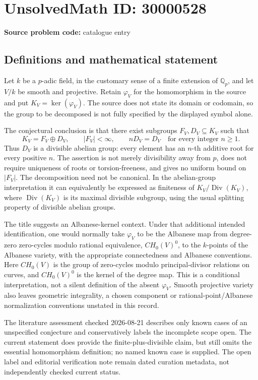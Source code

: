 \documentclass[11pt]{article}
\newcommand{\Q}{\mathbb{Q}}
\begin{document}
\section*{UnsolvedMath ID: 30000528}
\textbf{Source problem code:} catalogue entry
\subsection{Definitions and mathematical statement}
Let \(k\) be a \(p\)-adic field, in the customary sense of a finite extension of \(\Q_p\), and let \(V/k\) be smooth and projective. Retain \(\varphi_V\) for the homomorphism in the source and put \(K_V=\ker(\varphi_V)\). The source does not state its domain or codomain, so the group to be decomposed is not fully specified by the displayed symbol alone.

The conjectural conclusion is that there exist subgroups \(F_V,D_V\subseteq K_V\) such that
\[
 K_V=F_V\oplus D_V,\qquad |F_V|<\infty,\qquad
 nD_V=D_V\quad\text{for every integer }n\geq1.
\]
Thus \(D_V\) is a divisible abelian group: every element has an \(n\)-th additive root for every positive \(n\). The assertion is not merely divisibility away from \(p\), does not require uniqueness of roots or torsion-freeness, and gives no uniform bound on \(|F_V|\). The decomposition need not be canonical. In the abelian-group interpretation it can equivalently be expressed as finiteness of \(K_V/\operatorname{Div}(K_V)\), where \(\operatorname{Div}(K_V)\) is its maximal divisible subgroup, using the usual splitting property of divisible abelian groups.

The title suggests an Albanese-kernel context. Under that additional intended identification, one would normally take \(\varphi_V\) to be the Albanese map from degree-zero zero-cycles modulo rational equivalence, \(CH_0(V)^0\), to the \(k\)-points of the Albanese variety, with the appropriate connectedness and Albanese conventions. Here \(CH_0(V)\) is the group of zero-cycles modulo principal-divisor relations on curves, and \(CH_0(V)^0\) is the kernel of the degree map. This is a conditional interpretation, not a silent definition of the absent \(\varphi_V\). Smooth projective variety also leaves geometric integrality, a chosen component or rational-point/Albanese normalization conventions unstated in this record.

The literature assessment checked 2026-08-21 describes only known cases of an unspecified conjecture and conservatively labels the incomplete scope open. The current statement does provide the finite-plus-divisible claim, but still omits the essential homomorphism definition; no named known case is supplied. The open label and editorial verification note remain dated curation metadata, not independently checked current status.
\end{document}
